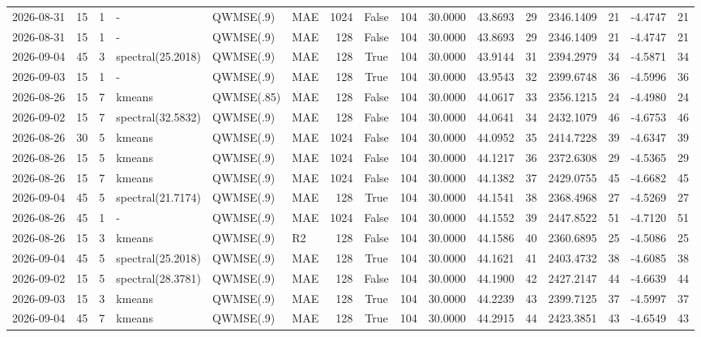 \documentclass[10pt]{article}
\begin{document}
\begin{landscape}
\begin{longtable}{@{}lrrlllrcrrrrrrrr@{}}
2026-08-31 & 15 & 1 & - & QWMSE(.9) & MAE & 1024 & False & 104 & 30.0000 & 43.8693 & 29 & 2346.1409 & 21 & -4.4747 & 21 \\
2026-08-31 & 15 & 1 & - & QWMSE(.9) & MAE & 128 & False & 104 & 30.0000 & 43.8693 & 29 & 2346.1409 & 21 & -4.4747 & 21 \\
2026-09-04 & 45 & 3 & spectral(25.2018) & QWMSE(.9) & MAE & 128 & True & 104 & 30.0000 & 43.9144 & 31 & 2394.2979 & 34 & -4.5871 & 34 \\
2026-09-03 & 15 & 1 & - & QWMSE(.9) & MAE & 128 & True & 104 & 30.0000 & 43.9543 & 32 & 2399.6748 & 36 & -4.5996 & 36 \\
2026-08-26 & 15 & 7 & kmeans & QWMSE(.85) & MAE & 128 & False & 104 & 30.0000 & 44.0617 & 33 & 2356.1215 & 24 & -4.4980 & 24 \\
2026-09-02 & 15 & 7 & spectral(32.5832) & QWMSE(.9) & MAE & 128 & False & 104 & 30.0000 & 44.0641 & 34 & 2432.1079 & 46 & -4.6753 & 46 \\
2026-08-26 & 30 & 5 & kmeans & QWMSE(.9) & MAE & 1024 & False & 104 & 30.0000 & 44.0952 & 35 & 2414.7228 & 39 & -4.6347 & 39 \\
2026-08-26 & 15 & 5 & kmeans & QWMSE(.9) & MAE & 1024 & False & 104 & 30.0000 & 44.1217 & 36 & 2372.6308 & 29 & -4.5365 & 29 \\
2026-08-26 & 15 & 7 & kmeans & QWMSE(.9) & MAE & 1024 & False & 104 & 30.0000 & 44.1382 & 37 & 2429.0755 & 45 & -4.6682 & 45 \\
2026-09-04 & 45 & 5 & spectral(21.7174) & QWMSE(.9) & MAE & 128 & True & 104 & 30.0000 & 44.1541 & 38 & 2368.4968 & 27 & -4.5269 & 27 \\
2026-08-26 & 45 & 1 & - & QWMSE(.9) & MAE & 1024 & False & 104 & 30.0000 & 44.1552 & 39 & 2447.8522 & 51 & -4.7120 & 51 \\
2026-08-26 & 15 & 3 & kmeans & QWMSE(.9) & R2 & 128 & False & 104 & 30.0000 & 44.1586 & 40 & 2360.6895 & 25 & -4.5086 & 25 \\
2026-09-04 & 45 & 5 & spectral(25.2018) & QWMSE(.9) & MAE & 128 & True & 104 & 30.0000 & 44.1621 & 41 & 2403.4732 & 38 & -4.6085 & 38 \\
2026-09-02 & 15 & 5 & spectral(28.3781) & QWMSE(.9) & MAE & 128 & False & 104 & 30.0000 & 44.1900 & 42 & 2427.2147 & 44 & -4.6639 & 44 \\
2026-09-03 & 15 & 3 & kmeans & QWMSE(.9) & MAE & 128 & True & 104 & 30.0000 & 44.2239 & 43 & 2399.7125 & 37 & -4.5997 & 37 \\
2026-09-04 & 45 & 7 & kmeans & QWMSE(.9) & MAE & 128 & True & 104 & 30.0000 & 44.2915 & 44 & 2423.3851 & 43 & -4.6549 & 43 \\

\end{longtable}
\end{landscape}
\end{document}
